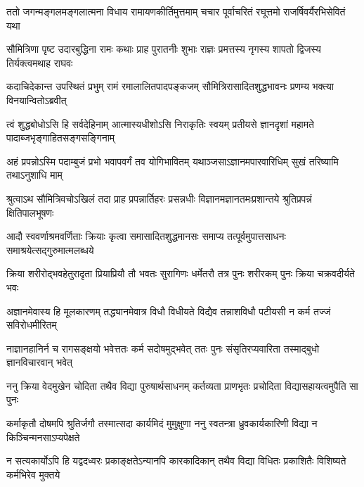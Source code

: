 


\fourlineindentedshloka
{ततो जगन्मङ्गलमङ्गलात्मना}
{विधाय रामायणकीर्तिमुत्तमाम्}
{चचार पूर्वाचरितं रघूत्तमो}
{राजर्षिवर्यैरभिसेवितं यथा} %

\fourlineindentedshloka
{सौमित्रिणा पृष्ट उदारबुद्धिना}
{रामः कथाः प्राह पुरातनीः शुभाः}
{राज्ञः प्रमत्तस्य नृगस्य शापतो}
{द्विजस्य तिर्यक्त्वमथाह राघवः} %

\fourlineindentedshloka
{कदाचिदेकान्त उपस्थितं प्रभुम्}
{रामं रमालालितपादपङ्कजम्}
{सौमित्रिरासादितशुद्धभावनः}
{प्रणम्य भक्त्या विनयान्वितोऽब्रवीत्} %

\fourlineindentedshloka
{त्वं शुद्धबोधोऽसि हि सर्वदेहिनाम्}
{आत्मास्यधीशोऽसि निराकृतिः स्वयम्}
{प्रतीयसे ज्ञानदृशां महामते}
{पादाब्जभृङ्गाहितसङ्गसङ्गिनाम्} %

\fourlineindentedshloka
{अहं प्रपन्नोऽस्मि पदाम्बुजं प्रभो}
{भवापवर्गं तव योगिभावितम्}
{यथाञ्जसाऽज्ञानमपारवारिधिम्}
{सुखं तरिष्यामि तथाऽनुशाधि माम्} %

\fourlineindentedshloka
{श्रुत्वाऽथ सौमित्रिवचोऽखिलं तदा}
{प्राह प्रपन्नार्तिहरः प्रसन्नधीः}
{विज्ञानमज्ञानतमःप्रशान्तये}
{श्रुतिप्रपन्नं क्षितिपालभूषणः} %

\fourlineindentedshloka
{आदौ स्ववर्णाश्रमवर्णिताः क्रियाः}
{कृत्वा समासादितशुद्धमानसः}
{समाप्य तत्पूर्वमुपात्तसाधनः}
{समाश्रयेत्सद्गुरुमात्मलब्धये} %

\fourlineindentedshloka
{क्रिया शरीरोद्भवहेतुरादृता}
{प्रियाप्रियौ तौ भवतः सुरागिणः}
{धर्मेतरौ तत्र पुनः शरीरकम्}
{पुनः क्रिया चक्रवदीर्यते भवः} %

\fourlineindentedshloka
{अज्ञानमेवास्य हि मूलकारणम्}
{तद्ध्यानमेवात्र विधौ विधीयते}
{विद्यैव तन्नाशविधौ पटीयसी}
{न कर्म तज्जं सविरोधमीरितम्} %

\fourlineindentedshloka
{नाज्ञानहानिर्न च रागसङ्क्षयो}
{भवेत्ततः कर्म सदोषमुद्भवेत्}
{ततः पुनः संसृतिरप्यवारिता}
{तस्माद्बुधो ज्ञानविचारवान् भवेत्} %

\fourlineindentedshloka
{ननु क्रिया वेदमुखेन चोदिता}
{तथैव विद्या पुरुषार्थसाधनम्}
{कर्तव्यता प्राणभृतः प्रचोदिता}
{विद्यासहायत्वमुपैति सा पुनः} %

\fourlineindentedshloka
{कर्माकृतौ दोषमपि श्रुतिर्जगौ}
{तस्मात्सदा कार्यमिदं मुमुक्षुणा}
{ननु स्वतन्त्रा ध्रुवकार्यकारिणी}
{विद्या न किञ्चिन्मनसाऽप्यपेक्षते} %

\fourlineindentedshloka
{न सत्यकार्योऽपि हि यद्वदध्वरः}
{प्रकाङ्क्षतेऽन्यानपि कारकादिकान्}
{तथैव विद्या विधितः प्रकाशितैः}
{विशिष्यते कर्मभिरेव मुक्तये} %

